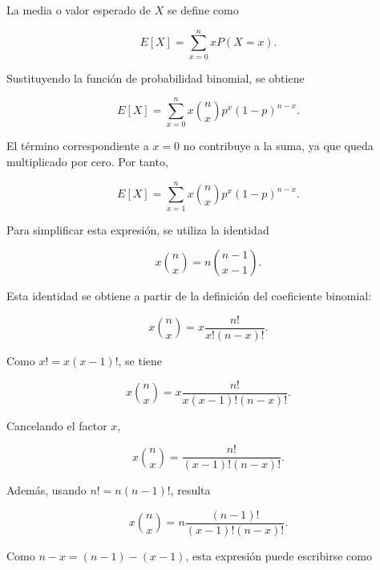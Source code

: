 \documentclass[12pt,a4paper]{article}
\begin{document}
La media o valor esperado de $X$ se define como

\begin{equation}
    E[X]
    =
    \sum_{x=0}^{n} xP(X=x).
\end{equation}

Sustituyendo la función de probabilidad binomial, se obtiene

\begin{equation}
    E[X]
    =
    \sum_{x=0}^{n}
    x\binom{n}{x}p^x(1-p)^{n-x}.
\end{equation}

El término correspondiente a $x=0$ no contribuye a la suma, ya que queda multiplicado por cero. Por tanto,

\begin{equation}
    E[X]
    =
    \sum_{x=1}^{n}
    x\binom{n}{x}p^x(1-p)^{n-x}.
    \label{eq:ap_media_binomial_suma}
\end{equation}

Para simplificar esta expresión, se utiliza la identidad

\begin{equation}
    x\binom{n}{x}
    =
    n\binom{n-1}{x-1}.
    \label{eq:ap_identidad_media_binomial}
\end{equation}

Esta identidad se obtiene a partir de la definición del coeficiente binomial:

\begin{equation}
    x\binom{n}{x}
    =
    x\frac{n!}{x!(n-x)!}.
\end{equation}

Como $x!=x(x-1)!$, se tiene

\begin{equation}
    x\binom{n}{x}
    =
    x\frac{n!}{x(x-1)!(n-x)!}.
\end{equation}

Cancelando el factor $x$,

\begin{equation}
    x\binom{n}{x}
    =
    \frac{n!}{(x-1)!(n-x)!}.
\end{equation}

Además, usando $n!=n(n-1)!$, resulta

\begin{equation}
    x\binom{n}{x}
    =
    n\frac{(n-1)!}{(x-1)!(n-x)!}.
\end{equation}

Como $n-x=(n-1)-(x-1)$, esta expresión puede escribirse como
\end{document}
